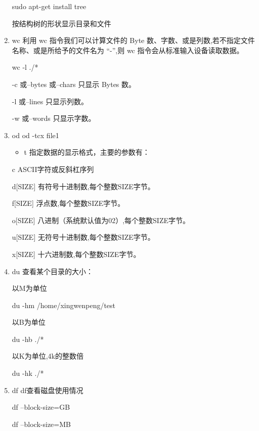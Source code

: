 \documentclass[11pt]{article}
\begin{document}
\begin{enumerate}
sudo apt-get install tree

按结构树的形状显示目录和文件
\item wc
\label{sec-1-1-2-21}
利用 wc 指令我们可以计算文件的 Byte 数、字数、或是列数,若不指定文件名称、或是所给予的文件名为
“-”,则 wc 指令会从标准输入设备读取数据。

wc -l ./* 

-c 或--bytes 或--chars 只显示 Bytes 数。

-l 或--lines 只显示列数。

-w 或--words 只显示字数。

\item od
\label{sec-1-1-2-22}
od -tcx file1

\begin{itemize}
\item t 指定数据的显示格式，主要的参数有：
\end{itemize}

c ASCII字符或反斜杠序列 

d[SIZE] 有符号十进制数,每个整数SIZE字节。 

f[SIZE] 浮点数,每个整数SIZE字节。 

o[SIZE] 八进制（系统默认值为02）,每个整数SIZE字节。 

u[SIZE] 无符号十进制数,每个整数SIZE字节。 

x[SIZE] 十六进制数,每个整数SIZE字节。 

\item du
\label{sec-1-1-2-23}
查看某个目录的大小：

以M为单位

du -hm /home/xingwenpeng/test

以B为单位

du -hb ./*

以K为单位,4k的整数倍

du -hk ./*
\item df
\label{sec-1-1-2-24}
df查看磁盘使用情况

df --block-size=GB


df --block-size=MB
\end{enumerate}
\end{document}
